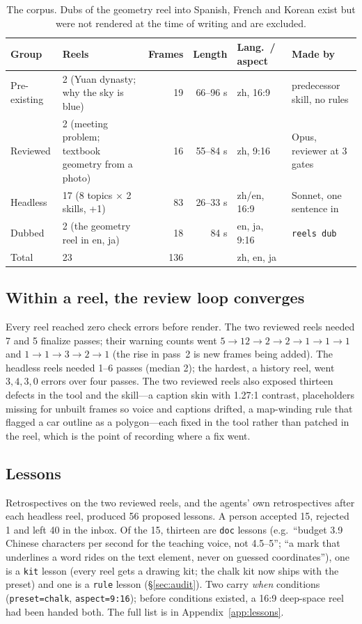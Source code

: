 \documentclass[11pt]{article}
\begin{document}
\begin{table}[t]
\centering\small
\begin{tabular}{lp{4.3cm}rrlp{3.4cm}}
\toprule
Group & Reels & Frames & Length & Lang.\ / aspect & Made by \\
\midrule
Pre-existing & 2 (Yuan dynasty; why the sky is blue) & 19 & 66--96 s & zh, 16:9 & predecessor skill, no rules \\
Reviewed & 2 (meeting problem; textbook geometry from a photo) & 16 & 55--84 s & zh, 9:16 & Opus, reviewer at 3 gates \\
Headless & 17 (8 topics $\times$ 2 skills, +1) & 83 & 26--33 s & zh/en, 16:9 & Sonnet, one sentence in \\
Dubbed & 2 (the geometry reel in en, ja) & 18 & 84 s & en, ja, 9:16 & \texttt{reels dub} \\
\midrule
Total & 23 & 136 & & zh, en, ja & \\
\bottomrule
\end{tabular}
\caption{The corpus. Dubs of the geometry reel into Spanish, French and Korean exist but were not
rendered at the time of writing and are excluded.}
\label{tab:corpus}
\end{table}

\subsection{Within a reel, the review loop converges}
Every reel reached zero check errors before render. The two reviewed reels needed 7 and 5 finalize
passes; their warning counts went $5 \rightarrow 12 \rightarrow 2 \rightarrow 2 \rightarrow 1
\rightarrow 1 \rightarrow 1$ and $1 \rightarrow 1 \rightarrow 3 \rightarrow 2 \rightarrow 1$ (the rise
in pass~2 is new frames being added). The headless reels needed 1--6 passes (median 2); the hardest,
a history reel, went $3, 4, 3, 0$ errors over four passes. The two reviewed reels also exposed
thirteen defects in the tool and the skill---a caption skin with 1.27:1 contrast, placeholders
missing for unbuilt frames so voice and captions drifted, a map-winding rule that flagged a car
outline as a polygon---each fixed in the tool rather than patched in the reel, which is the point of recording where a fix went.

\subsection{Lessons}
\label{sec:lessons}
Retrospectives on the two reviewed reels, and the agents' own retrospectives after each headless
reel, produced 56 proposed lessons. A person accepted 15, rejected 1 and left 40 in the inbox. Of the
15, thirteen are \texttt{doc} lessons (e.g.\ ``budget 3.9 Chinese characters per second for the
teaching voice, not 4.5--5''; ``a mark that underlines a word rides on the text element, never on
guessed coordinates''), one is a \texttt{kit} lesson (every reel gets a drawing kit; the chalk kit now
ships with the preset) and one is a \texttt{rule} lesson (\S\ref{sec:audit}). Two carry \emph{when}
conditions (\texttt{preset=chalk}, \texttt{aspect=9:16}); before conditions existed, a 16:9
deep-space reel had been handed both. The full list is in Appendix~\ref{app:lessons}.
\end{document}
